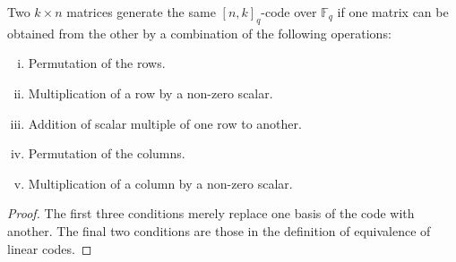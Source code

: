 \begin{theorem}
    Two $k\times n$ matrices generate the same $[n,k]_q$-code over $\mathbb{F}_q$ if one matrix can be obtained from the other by a combination of the following operations:
    \begin{enumerate}[(i)]
        \item Permutation of the rows.
        \item Multiplication of a row by a non-zero scalar.
        \item Addition of scalar multiple of one row to another.
        \item Permutation of the columns.
        \item Multiplication of a column by a non-zero scalar.
    \end{enumerate}
\end{theorem}
\begin{proof}
    The first three conditions merely replace one basis of the code with another. The final two conditions are those in the definition of equivalence of linear codes.
\end{proof}

